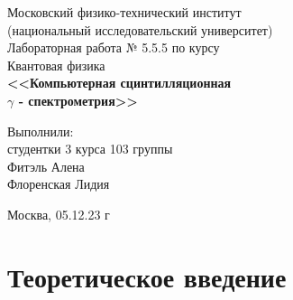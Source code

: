 \documentclass{article}
\begin{document}
 
\begin{titlepage}
     \begin{center}
     \large Московский физико-технический институт\\
    (национальный исследовательский университет)\\
    \vspace{4cm}
    \Large Лабораторная работа № 5.5.5 по курсу \\  Квантовая физика\\
    \vspace{4cm}
    \textbf{\Huge <<Компьютерная сцинтилляционная \\ $\gamma$ - спектрометрия>>}\\
     \end{center}
    \vspace{5cm}
    {\par \raggedleft \large Выполнили:\\ студентки 3 курса
    103 группы\\Фитэль Алена\\ Флоренская Лидия \par}
    \vspace{3cm}
    \begin{center}
        Москва, 05.12.23 г
    \end{center}
\end{titlepage}

\section{Теоретическое введение}
\end{document}

